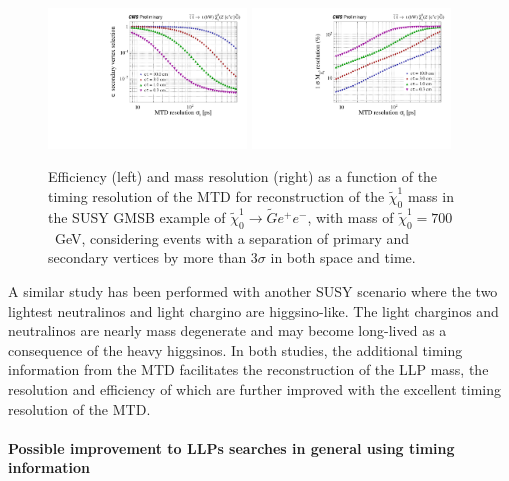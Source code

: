 \begin{figure}[t]\begin{center}
\includegraphics[width=0.47\textwidth]{figures/MTD/171025_52.pdf}
\includegraphics[width=0.47\textwidth]{figures/MTD/171025_53.pdf}
\caption{
Efficiency (left) and mass resolution (right) as a function of the timing resolution of the MTD for reconstruction of the $\tilde{\chi}_0^1$ mass in the SUSY GMSB example of $\tilde{\chi}_0^1 \to \tilde{G} e^{+} e^{-}$, with mass of $\tilde{\chi}_0^1=700$~GeV, considering events with a separation of primary and secondary vertices by more than $3\sigma$ in both space and time.
}
\label{fig:cmsupgrade_mtd}
\end{center}
\end{figure}

A similar study has been performed with another SUSY scenario where the two lightest neutralinos and light chargino are higgsino-like. The light charginos and neutralinos are nearly mass degenerate and may become long-lived as a consequence of the heavy higgsinos. In both studies, the additional timing information from the MTD facilitates the reconstruction of the LLP mass, the resolution and efficiency of which are further improved with the excellent timing resolution of the MTD.



\paragraph{Possible improvement to LLPs searches in general using timing information}

